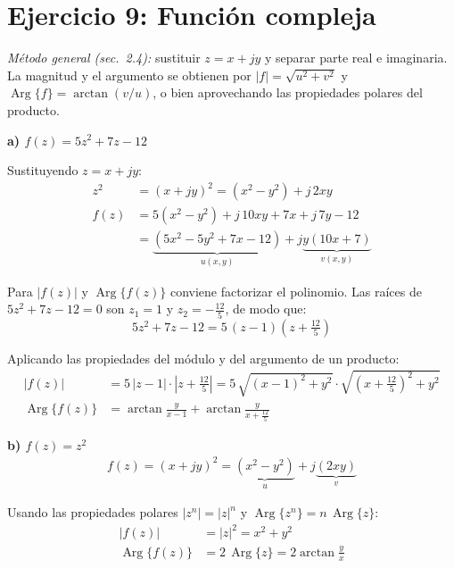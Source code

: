 \documentclass[10pt,a4paper]{article}
\begin{document}
\section*{Ejercicio 9: Función compleja}

\noindent\textit{Método general (sec.~2.4):} sustituir $z = x+jy$ y separar parte real e imaginaria. La magnitud y el argumento se obtienen por $|f| = \sqrt{u^2+v^2}$ y $\operatorname{Arg}\{f\} = \arctan(v/u)$, o bien aprovechando las propiedades polares del producto.

\bigskip

\noindent\textbf{a) $f(z) = 5z^2+7z-12$}

Sustituyendo $z = x+jy$:
\begin{align*}
	z^2 &= (x+jy)^2 = (x^2-y^2) + j\,2xy \\
	f(z) &= 5(x^2-y^2) + j\,10xy + 7x + j\,7y - 12 \\
	     &= \underbrace{(5x^2-5y^2+7x-12)}_{u(x,y)} + j\underbrace{y(10x+7)}_{v(x,y)}
\end{align*}

Para $|f(z)|$ y $\operatorname{Arg}\{f(z)\}$ conviene factorizar el polinomio. Las raíces de $5z^2+7z-12=0$ son $z_1=1$ y $z_2=-\tfrac{12}{5}$, de modo que:
\[
	5z^2+7z-12 = 5\,(z-1)\!\left(z+\tfrac{12}{5}\right)
\]

Aplicando las propiedades del módulo y del argumento de un producto:
\begin{align*}
	|f(z)| &= 5\,|z-1|\cdot\!\left|z+\tfrac{12}{5}\right|
	        = 5\,\sqrt{(x-1)^2+y^2}\cdot\sqrt{\!\left(x+\tfrac{12}{5}\right)^{\!2}+y^2} \\[4pt]
	\operatorname{Arg}\{f(z)\} &= \arctan\!\frac{y}{x-1} + \arctan\!\frac{y}{x+\tfrac{12}{5}}
\end{align*}

\bigskip

\noindent\textbf{b) $f(z) = z^2$}
\begin{align*}
	f(z) = (x+jy)^2 = \underbrace{(x^2-y^2)}_{u} + j\underbrace{(2xy)}_{v}
\end{align*}

Usando las propiedades polares $|z^n| = |z|^n$ y $\operatorname{Arg}\{z^n\}=n\,\operatorname{Arg}\{z\}$:
\begin{align*}
	|f(z)| &= |z|^2 = x^2+y^2 \\
	\operatorname{Arg}\{f(z)\} &= 2\,\operatorname{Arg}\{z\} = 2\arctan\!\frac{y}{x}
\end{align*}
\end{document}
